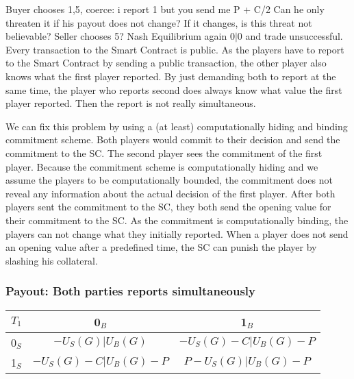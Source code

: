 \documentclass{cacthesis}
\begin{document}
Buyer chooses 1,5, coerce: i report 1 but you send me P + C/2\newline
Can he only threaten it if his payout does not change? If it changes, is this threat not believable?\newline
Seller chooses 5?\newline
Nash Equilibrium again $0|0$ and trade unsuccessful. 
 Every transaction to the Smart Contract is public. As the players have to report to the Smart Contract by sending a public transaction, the other player also knows what the first player reported. By just demanding both to report at the same time, the player who reports second does always know what value the first player reported. Then the report is not really simultaneous.\newline
 
 
 We can fix this problem by using a (at least) computationally hiding and binding commitment scheme. Both players would commit to their decision and send the commitment to the SC. The second player sees the commitment of the first player. Because the commitment scheme is computationally hiding and we assume the players to be computationally bounded, the commitment does not reveal any information about the actual decision of the first player. \newline
 After both players sent the commitment to the SC, they both send the opening value for their commitment to the SC. As the commitment is computationally binding, the players can not change what they initially reported. When a player does not send an opening value after a predefined time, the SC can punish the player by slashing his collateral.
\subsubsection{Payout: Both parties reports simultaneously}

\begin{center}
\begin{tabular}{ c||c|c| }
$T_1$& 0$_B$ & 1$_B$   \\
\hline
\hline
0$_S$ & $-U_S(G) | U_B(G)$ & $-U_S(G) - C | U_B(G) - P$ \\
\hline
1$_S$ & $-U_S(G) - C | U_B(G) - P$ & $P - U_S(G) | U_B(G) - P$\\ 
\hline
\end{tabular}
\end{center}
\end{document}
